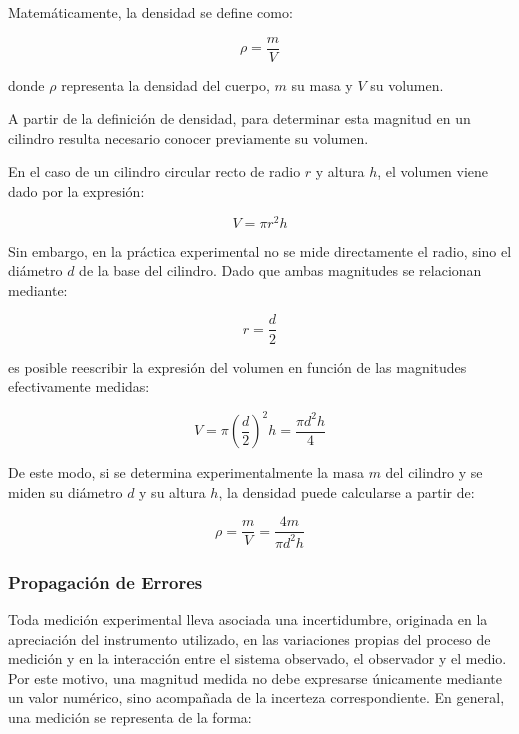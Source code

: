 Matemáticamente, la densidad se define como:

\begin{equation}
\rho = \frac{m}{V} \label{eq:densidad}
\end{equation}

donde $\rho$ representa la densidad del cuerpo, $m$ su masa y $V$ su volumen.

A partir de la definición de densidad, para determinar esta magnitud en un cilindro resulta necesario conocer previamente su volumen.

En el caso de un cilindro circular recto de radio $r$ y altura $h$, el volumen viene dado por la expresión:

\begin{equation}
V = \pi r^2 h
\end{equation}

Sin embargo, en la práctica experimental no se mide directamente el radio, sino el diámetro $d$ de la base del cilindro. Dado que ambas magnitudes se relacionan mediante:

\begin{equation}
r = \frac{d}{2}
\end{equation}

es posible reescribir la expresión del volumen en función de las magnitudes efectivamente medidas:

\begin{equation}
V = \pi \left( \frac{d}{2} \right)^2 h = \frac{\pi d^2 h}{4}
\end{equation}

De este modo, si se determina experimentalmente la masa $m$ del cilindro y se miden su diámetro $d$ y su altura $h$, la densidad puede calcularse a partir de:

\begin{equation}
\rho = \frac{m}{V} = \frac{4m}{\pi d^2 h}
\end{equation}

\subsubsection{Propagación de Errores}

Toda medición experimental lleva asociada una incertidumbre, originada en la apreciación del instrumento utilizado, en las variaciones propias del proceso de medición y en la interacción entre el sistema observado, el observador y el medio. Por este motivo, una magnitud medida no debe expresarse únicamente mediante un valor numérico, sino acompañada de la incerteza correspondiente. En general, una medición se representa de la forma:

